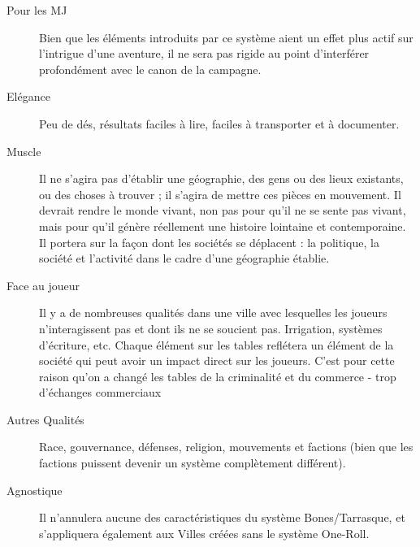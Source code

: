 \documentclass{article}
\begin{document}
\begin{description}
	\item [Pour les MJ] Bien que les éléments introduits par ce système aient un effet plus actif sur l'intrigue d'une aventure, il ne sera pas rigide au point d'interférer profondément avec le canon de la campagne.
	\item [Elégance] Peu de dés, résultats faciles à lire, faciles à transporter et à documenter.
	\item [Muscle] Il ne s'agira pas d'établir une géographie, des gens ou des lieux existants, ou des choses à trouver ; il s'agira de mettre ces pièces en mouvement. Il devrait rendre le monde vivant, non pas pour qu'il ne se sente pas vivant, mais pour qu'il génère réellement une histoire lointaine et contemporaine. Il portera sur la façon dont les sociétés se déplacent : la politique, la société et l'activité dans le cadre d'une géographie établie.
	\item [Face au joueur] Il y a de nombreuses qualités dans une ville avec lesquelles les joueurs n'interagissent pas et dont ils ne se soucient pas. Irrigation, systèmes d'écriture, etc. Chaque élément sur les tables reflétera un élément de la société qui peut avoir un impact direct sur les joueurs. C'est pour cette raison qu'on a changé les tables de la criminalité et du commerce - trop d'échanges commerciaux 
	\item [Autres Qualités] Race, gouvernance, défenses, religion, mouvements et factions (bien que les factions puissent devenir un système complètement différent).
	\item [Agnostique] Il n'annulera aucune des caractéristiques du système Bones/Tarrasque, et s'appliquera également aux Villes créées sans le système One-Roll.
\end{description}
\end{document}
